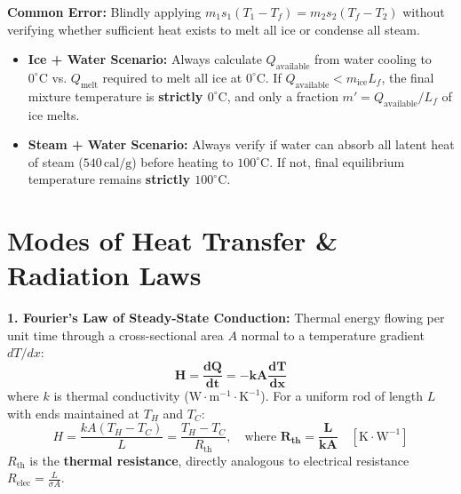 \documentclass[10pt,a4paper]{article}
\begin{document}
\begin{trapbox}
\textbf{Common Error:} Blindly applying $m_1 s_1 (T_1 - T_f) = m_2 s_2 (T_f - T_2)$ without verifying whether sufficient heat exists to melt all ice or condense all steam.
\begin{itemize}
  \item \textbf{Ice + Water Scenario:} Always calculate $Q_{\text{available}}$ from water cooling to $0^\circ\mathrm{C}$ vs. $Q_{\text{melt}}$ required to melt all ice at $0^\circ\mathrm{C}$. If $Q_{\text{available}} < m_{\text{ice}} L_f$, the final mixture temperature is \textbf{strictly $0^\circ\mathrm{C}$}, and only a fraction $m' = Q_{\text{available}}/L_f$ of ice melts.
  \item \textbf{Steam + Water Scenario:} Always verify if water can absorb all latent heat of steam ($540\,\mathrm{cal}/\mathrm{g}$) before heating to $100^\circ\mathrm{C}$. If not, final equilibrium temperature remains \textbf{strictly $100^\circ\mathrm{C}$}.
\end{itemize}
\end{trapbox}

\section{Modes of Heat Transfer \& Radiation Laws}

\begin{conceptbox}
\textbf{1. Fourier's Law of Steady-State Conduction:}
Thermal energy flowing per unit time through a cross-sectional area $A$ normal to a temperature gradient $dT/dx$:
\begin{equation}
  \mathbf{H = \frac{dQ}{dt} = -k A \frac{dT}{dx}}
\end{equation}
where $k$ is thermal conductivity ($\mathrm{W}\cdot\mathrm{m}^{-1}\cdot\mathrm{K}^{-1}$). For a uniform rod of length $L$ with ends maintained at $T_H$ and $T_C$:
\begin{equation}
  H = \frac{k A (T_H - T_C)}{L} = \frac{T_H - T_C}{R_{\text{th}}}, \quad \text{where } \mathbf{R_{\text{th}} = \frac{L}{k A}} \quad [\mathrm{K}\cdot\mathrm{W}^{-1}]
\end{equation}
$R_{\text{th}}$ is the \textbf{thermal resistance}, directly analogous to electrical resistance $R_{\text{elec}} = \frac{L}{\sigma A}$.
\end{conceptbox}
\end{document}
